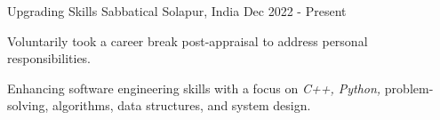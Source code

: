 


\begin{cventries}

\cventry
{Upgrading Skills}
{Sabbatical}
{Solapur, India}
{Dec 2022 - Present}
{
\begin{cvitems}
\item {Voluntarily took a career break post-appraisal to address personal responsibilities.}
\item {Enhancing software engineering skills with a focus on \textit{C++, Python,} problem-solving, algorithms, data structures, and system design.}
\end{cvitems}
}


\end{cventries}
